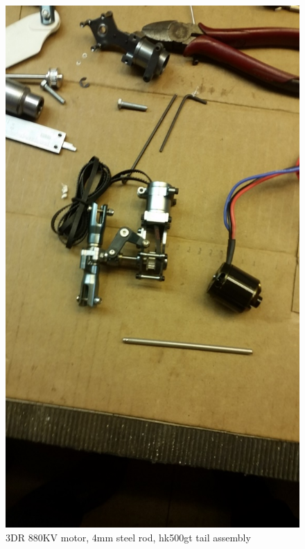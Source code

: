 \begin{figure}[h]
        \centering
         \begin{minipage}[t]{0.3\textwidth}
            \includegraphics[width =\textwidth]{VAPIQ-PICTURES/VPQParts}
              \caption{3DR 880KV motor, 4mm steel rod, hk500gt tail assembly}
            \label{fig:nlknl}
        \end{minipage}
        \hfill
        \begin{minipage}[t]{0.3\textwidth}

\end{minipage}
\end{figure}
